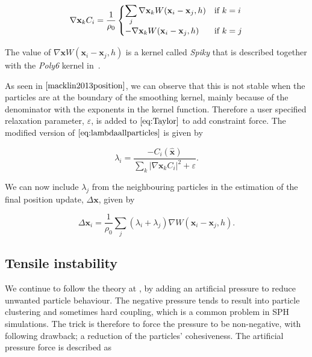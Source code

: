 \begin{equation}
 \nabla \mathbf{x}_k C_i = \frac{1}{\rho_0}
  \begin{cases}
  \label{eq:NablaC}
   \displaystyle \sum\limits_{j} \nabla \mathbf{x}_k W(\mathbf{x}_i - \mathbf{x}_j, h) & $\text{if }$ k = i \\
   - \nabla \mathbf{x}_k W(\mathbf{x}_i - \mathbf{x}_j, h) & $\text{if }$ k = j \\
  \end{cases}
\end{equation}

The value of $ \nabla \mathbf{x} W(\mathbf{x}_i - \mathbf{x}_j, h) $ is a
kernel called \textit{Spiky} that is described together with the \textit{Poly6}
kernel in~\cite{muller2003particle}.

As seen in $\cite{macklin2013position}$, we can observe that this is not stable
when the particles are at the boundary of the smoothing kernel, mainly because
of the denominator with the exponents in the kernel function.  Therefore a user
specified relaxation parameter, $\varepsilon$, is added to $\ref{eq:Taylor}$ to
add constraint force. The modified version of $\ref{eq:lambdaallparticles}$ is
given by

\begin{equation}
\label{eq:LambdaEpsilon}
\lambda_i = \frac{- C_i(\hat{\mathbf{x}}) }{ \sum\limits_{k} |\nabla \mathbf{x}_k C_i|^2 + \varepsilon}.
\end{equation}

We can now include $\lambda_j$ from the neighbouring particles in the
estimation of the final position update, $\Delta \mathbf{x}$, given by

\begin{equation}
\label{eq:DeltaP}
\Delta \mathbf{x}_i = \frac{1}{\rho_0} \sum\limits_{j} (\lambda_i + \lambda_j) \nabla W(\mathbf{x}_i - \mathbf{x}_j, h).
\end{equation}

\subsection{Tensile instability} We continue to follow the theory at
\cite{macklin2013position}, by adding an artificial pressure to reduce unwanted
particle behaviour. The negative pressure tends to result into particle
clustering and sometimes hard coupling, which is a common problem in SPH
simulations. The trick is therefore to force the pressure to be non-negative,
with following drawback; a reduction of the particles' cohesiveness. The
artificial pressure force is described as

